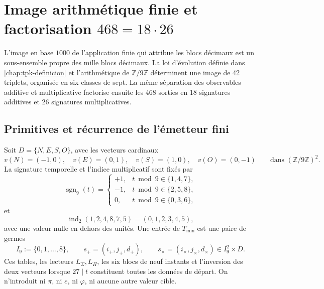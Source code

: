 \chapter[Image arithmétique finie et factorisation \(468=18\cdot26\)]{Image arithmétique finie et factorisation \(468=18\cdot26\)}
\label{chap:alfabeto-42}

L'image en base \(1000\) de l'application finie qui attribue les blocs décimaux est un
sous-ensemble propre des mille blocs décimaux. La loi d'évolution définie dans
\cref{chap:tpk-definicion} et l'arithmétique de \(\mathbb Z/9\mathbb Z\)
déterminent une image de 42 triplets, organisée en six classes de sept. La
même séparation des observables additive et multiplicative factorise ensuite les 468
sorties en 18 signatures additives et 26 signatures multiplicatives.

\section{Primitives et récurrence de l'émetteur fini}

\begin{definition}
\label{pf84:E02-15}
Soit \(D=\{N,E,S,O\}\), avec les vecteurs cardinaux
\[
 v(N)=(-1,0),\quad v(E)=(0,1),\quad
 v(S)=(1,0),\quad v(O)=(0,-1)
 \qquad\text{dans }(\mathbb Z/9\mathbb Z)^2.
\]
La signature temporelle et l'indice multiplicatif sont fixés par
\[
 \operatorname{sgn}_9(t)=
 \begin{cases}
 +1,&t\bmod9\in\{1,4,7\},\\
 -1,&t\bmod9\in\{2,5,8\},\\
 0,&t\bmod9\in\{0,3,6\},
 \end{cases}
\]
et
\[
 \operatorname{ind}_2(1,2,4,8,7,5)=(0,1,2,3,4,5),
\]
avec une valeur nulle en dehors des unités. Une entrée de \(T_{\min}\) est une paire
de germes
\[
 I_9:=\{0,1,\ldots,8\},\qquad
 s_+=(i_+,j_+,d_+),\qquad s_\times=(i_\times,j_\times,d_\times)
 \in I_9^2\times D.
\]
Ces tables, les lecteurs \(L_\Sigma,L_\Pi\), les six blocs de neuf
instants et l'inversion des deux vecteurs lorsque \(27\mid t\) constituent toutes les
données de départ. On n'introduit ni \(\pi\), ni \(e\), ni \(\varphi\), ni aucune autre
valeur cible.
\end{definition}

